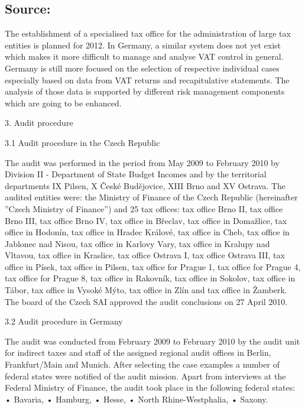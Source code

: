 \documentclass[10pt]{article}
\begin{document}
\subsection*{Source:}

The establishment of a specialised tax office for the administration of large tax entities is planned for 2012.
In Germany, a similar system does not yet exist which makes it more difficult to manage and analyse VAT control in general.
Germany is still more focused on the selection of respective individual cases especially based on data from VAT returns and recapitulative statements.
The analysis of those data is supported by different risk management components which are going to be enhanced.


3. Audit procedure



3.1 Audit procedure in the Czech Republic

The audit was performed in the period from May 2009 to February 2010 by Division II - Department of State Budget Incomes and by the territorial departments IX Pilsen, X České Budějovice, XIII Brno and XV Ostrava.
The audited entities were: the Ministry of Finance of the Czech Republic (hereinafter ”Czech Ministry of Finance”) and 25 tax offices: tax office Brno II, tax office Brno III, tax office Brno IV, tax office in Břeclav, tax office in Domažlice, tax office in Hodonín, tax office in Hradec Králové, tax office in Cheb, tax office in Jablonec nad Nisou, tax office in Karlovy Vary, tax office in Kralupy nad Vltavou, tax office in Kraslice, tax office Ostrava I, tax office Ostrava III, tax office in Písek, tax office in Pilsen, tax office for Prague 1, tax office for Prague 4, tax office for Prague 8, tax office in Rakovník, tax office in Sokolov, tax office in Tábor, tax office in Vysoké Mýto, tax office in Zlín and tax office in Žamberk.
The board of the Czech SAI approved the audit conclusions on 27 April 2010.


3.2 Audit procedure in Germany

The audit was conducted from February 2009 to February 2010 by the audit unit for indirect taxes and staff of the assigned regional audit offices in Berlin, Frankfurt/Main and Munich.
After selecting the case examples a number of federal states were notified of the audit mission.
Apart from interviews at the Federal Ministry of Finance, the audit took place in the following federal states: • Bavaria, • Hamburg, • Hesse, • North Rhine-Westphalia, • Saxony.


\pagebreak
\end{document}
